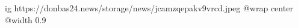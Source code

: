  
 
 
 
 

\ifcmt
  ig https://donbas24.news/storage/news/jcamzqepakv9vrcd.jpeg
  @wrap center
  @width 0.9
\fi
